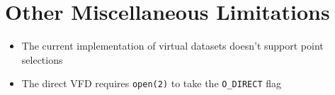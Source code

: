 \section{Other Miscellaneous Limitations}
\begin{itemize}
    \item The current implementation of virtual datasets doesn't support point selections
    \item The direct VFD requires \texttt{open(2)} to take the \texttt{O\_DIRECT} flag
\end{itemize}




